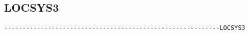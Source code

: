 


\subsection{LOCSYS3}
\begin{verbatim}
-----------------------------------------------------------LOCSYS3
\end{verbatim}


